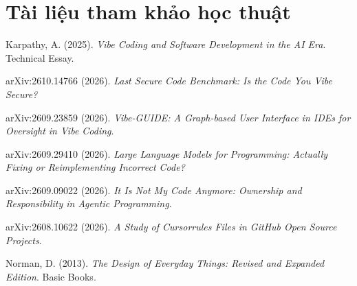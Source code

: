 \documentclass[a4paper,11pt]{article}
\begin{document}
\section{Tài liệu tham khảo học thuật}

\begin{enumerate}[label={[\arabic*]}]
    \item Karpathy, A. (2025). \textit{Vibe Coding and Software Development in the AI Era}. Technical Essay.
    \item arXiv:2610.14766 (2026). \textit{Last Secure Code Benchmark: Is the Code You Vibe Secure?}
    \item arXiv:2609.23859 (2026). \textit{Vibe-GUIDE: A Graph-based User Interface in IDEs for Oversight in Vibe Coding}.
    \item arXiv:2609.29410 (2026). \textit{Large Language Models for Programming: Actually Fixing or Reimplementing Incorrect Code?}
    \item arXiv:2609.09022 (2026). \textit{It Is Not My Code Anymore: Ownership and Responsibility in Agentic Programming}.
    \item arXiv:2608.10622 (2026). \textit{A Study of Cursorrules Files in GitHub Open Source Projects}.
    \item Norman, D. (2013). \textit{The Design of Everyday Things: Revised and Expanded Edition}. Basic Books.
\end{enumerate}
\end{document}
